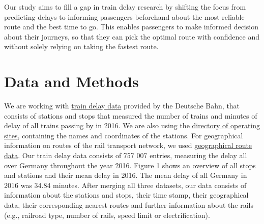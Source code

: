 \documentclass{article}
\theoremstyle{plain}
\theoremstyle{definition}
\theoremstyle{remark}
\begin{document}
Our study aims to fill a gap in train delay research by shifting the focus from predicting delays to informing passengers beforehand about the most reliable route and the best time to go. This enables passengers to make informed decision about their journeys, so that they can pick the optimal route with confidence and without solely relying on taking the fastest route.


\section{Data and Methods}\label{sec:methods}

We are working with \href{https://data.deutschebahn.com/dataset/ist-verkehrsdaten-der-db-cargo-auf-bst8-ebene.html}{train delay data} provided by the Deutsche Bahn, that consists of stations and stops that measured the number of trains and minutes of delay of all trains passing by in 2016. We are also using the \href{https://data.deutschebahn.com/dataset/betriebsstellen-gueterverkehr.html}{directory of operating sites}, containing the names and coordinates of the stations. For geographical information on routes of the rail transport network, we used \href{https://data.deutschebahn.com/dataset/betriebsstellen-gueterverkehr.html}{geographical route data}. Our train delay data consists of 757 007 entries, measuring the delay all over Germany throughout the year 2016. Figure 1 shows an overview of all stops and stations and their mean delay in 2016. The mean delay of all Germany in 2016 was 34.84 minutes. After merging all three datasets, our data consists of information about the stations and stops, their time stamp, their geographical data, their corresponding nearest routes and further information about the rails (e.g., railroad type, number of rails, speed limit or electrification).
\end{document}
